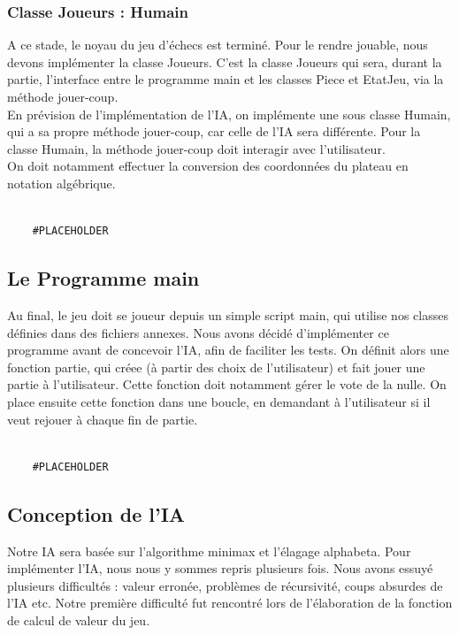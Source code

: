 \documentclass{article}
\begin{document}
\subsubsection{Classe Joueurs : Humain}
A ce stade, le noyau du jeu d'échecs est terminé. Pour le rendre jouable,
nous devons implémenter la classe Joueurs.
C'est la classe Joueurs qui sera, durant la partie, l'interface entre le programme main et les
classes Piece et EtatJeu, via la méthode jouer-coup.\\ En prévision de l'implémentation de l'IA,
on implémente une sous classe Humain, qui a sa propre méthode jouer-coup, car celle de l'IA sera différente.
Pour la classe Humain, la méthode jouer-coup doit interagir avec l'utilisateur. \\
On doit notamment effectuer la conversion des coordonnées du plateau en notation algébrique.


\begin{verbatim}

    #PLACEHOLDER
\end{verbatim}


\subsection{Le Programme main}
Au final, le jeu doit se joueur depuis un simple script main, qui utilise nos classes
définies dans des fichiers annexes.
Nous avons décidé d'implémenter ce programme avant de concevoir l'IA, 
afin de faciliter les tests.
On définit alors une fonction partie, qui créee (à partir des choix de l'utilisateur) et fait jouer une partie à l'utilisateur.
Cette fonction doit notamment gérer le vote de la nulle.
On place ensuite cette fonction dans une boucle, en demandant à l'utilisateur si il veut rejouer
à chaque fin de partie.
\begin{verbatim}

    #PLACEHOLDER
\end{verbatim}
\subsection{Conception de l'IA}
Notre IA sera basée sur l'algorithme minimax et l'élagage alphabeta.
Pour implémenter l'IA, nous nous y sommes repris plusieurs fois.
Nous avons essuyé plusieurs difficultés : valeur erronée, problèmes de récursivité, coups absurdes de l'IA etc.
Notre première difficulté fut rencontré lors de l'élaboration de la fonction de calcul de valeur du jeu.
\end{document}
